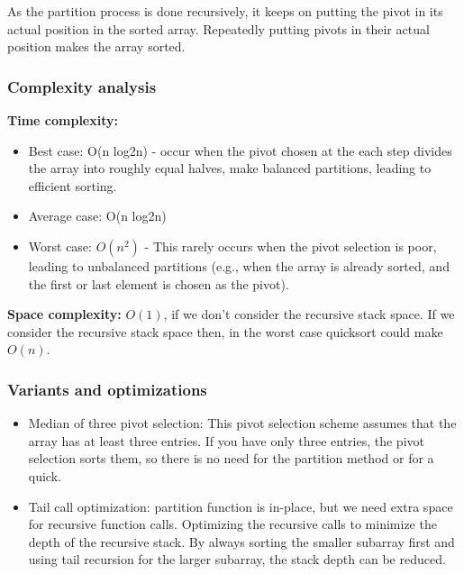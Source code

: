 \newpage

As the partition process is done recursively, it keeps on putting the pivot in its actual position in the sorted array. Repeatedly putting pivots in their actual position makes the array sorted.

\subsubsection{Complexity analysis}

\textbf{Time complexity:}
\begin{itemize}
    \item Best case: O(n log2n)  - occur when the pivot chosen at the each step divides the array into roughly equal halves, make balanced partitions, leading to efficient sorting.
    \item Average case: O(n log2n)
    \item Worst case: $O(n^2)$ - This rarely occurs when the pivot selection is poor, leading to unbalanced partitions (e.g., when the array is already sorted, and the first or last element is chosen as the pivot).
\end{itemize}

\textbf{Space complexity:} $O(1)$, if we don’t consider the recursive stack space. If we consider the recursive stack space then, in the worst case quicksort could make $O(n)$. ~\cite{ref10}

\subsubsection{Variants and optimizations}
\begin{itemize}[label=-]
    \item Median of three pivot selection: This pivot selection scheme assumes that the array has at least three entries. If you have only three entries, the pivot selection sorts them, so there is no need for the partition method or for a quick. ~\cite{ref7}
    \item Tail call optimization: partition function is in-place, but we need extra space for recursive function calls. Optimizing the recursive calls to minimize the depth of the recursive stack. By always sorting the smaller subarray first and using tail recursion for the larger subarray, the stack depth can be reduced.
\end{itemize}

\vspace{10pt}